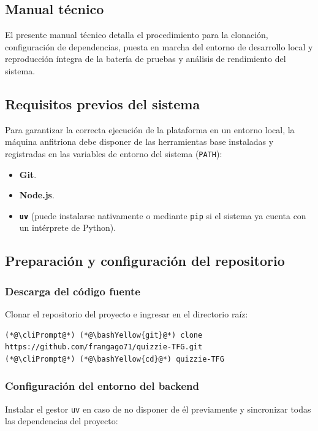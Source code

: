 \begin{appendices}

\chapter{Manual técnico}\label{anexo:manual_tecnico}

El presente manual técnico detalla el procedimiento para la clonación, configuración de dependencias, puesta en marcha del entorno de desarrollo local y reproducción íntegra de la batería de pruebas y análisis de rendimiento del sistema.

\section*{Requisitos previos del sistema}\label{sec:manual_requisitos}

Para garantizar la correcta ejecución de la plataforma en un entorno local, la máquina anfitriona debe disponer de las herramientas base instaladas y registradas en las variables de entorno del sistema (\texttt{PATH}):

\begin{itemize}
    \item \textbf{Git}\cite{git_official}.
    \item \textbf{Node.js}\cite{nodejs_official}.
    \item \textbf{\texttt{uv}}\cite{uv_official} (puede instalarse nativamente o mediante \texttt{pip} si el sistema ya cuenta con un intérprete de Python).
\end{itemize}

\section*{Preparación y configuración del repositorio}\label{sec:manual_preparacion}

\subsection*{Descarga del código fuente}
Clonar el repositorio del proyecto e ingresar en el directorio raíz:

\begin{lstlisting}
(*@\cliPrompt@*) (*@\bashYellow{git}@*) clone https://github.com/frangago71/quizzie-TFG.git
(*@\cliPrompt@*) (*@\bashYellow{cd}@*) quizzie-TFG
\end{lstlisting}

\subsection*{Configuración del entorno del backend}
Instalar el gestor \texttt{uv} en caso de no disponer de él previamente y sincronizar todas las dependencias del proyecto:


\end{appendices}
